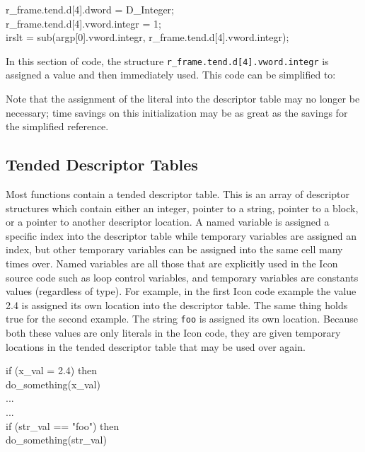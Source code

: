 \begin{iconcode}
r\_frame.tend.d[4].dword = D\_Integer;\\
r\_frame.tend.d[4].vword.integr = 1;\\
irslt = sub(argp[0].vword.integr, r\_frame.tend.d[4].vword.integr);
\end{iconcode}

In this section of code, the structure
\texttt{r\_frame.tend.d[4].vword.integr} is assigned a value and then
immediately used. This code can be simplified to:



Note that the assignment of the literal into the descriptor table may
no longer be necessary; time savings on this initialization may be as
great as the savings for the simplified reference.


\subsection{Tended Descriptor Tables}

Most functions contain a tended descriptor table. This is an array of
descriptor structures which contain either an integer, pointer to a
string, pointer to a block, or a pointer to another descriptor
location. A named variable is assigned a specific index into the
descriptor table while temporary variables are assigned an index, but
other temporary variables can be assigned into the same cell many
times over. Named variables are all those that are explicitly used in
the Icon source code such as loop control variables, and temporary
variables are constants values (regardless of type). For example, in
the first Icon code example the value 2.4 is assigned its own location
into the descriptor table. The same thing holds true for the second
example. The string \texttt{{\textquotedbl}foo{\textquotedbl}} is
assigned its own location. Because both these values are only literals
in the Icon code, they are given temporary locations in the tended
descriptor table that may be used over again.

\begin{iconcode}
\>   if (x\_val = 2.4) then \\
\> \>   do\_something(x\_val) \\
\>   ... \\
\>   ... \\
\>   if (str\_val == "foo") then \\
\> \>   do\_something(str\_val)
\end{iconcode}


